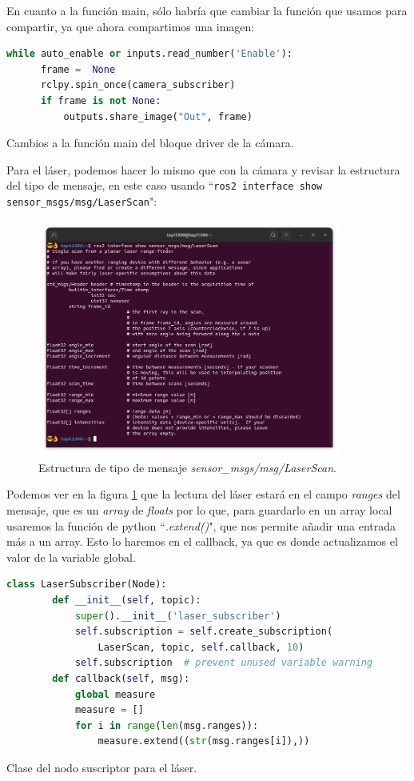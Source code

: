 En cuanto a la función main, sólo habría que cambiar la función que usamos para compartir, ya que ahora compartimos una imagen:
\begin{code}[H]
  \begin{lstlisting}[language=python]
  while auto_enable or inputs.read_number('Enable'):
      frame =  None
      rclpy.spin_once(camera_subscriber)
      if frame is not None:
          outputs.share_image("Out", frame)
  \end{lstlisting}
  \caption[Cambios main bloque cámara]{Cambios a la función main del bloque driver de la cámara.}
  \label{cod:cam_main_changes}
\end{code}
Para el láser, podemos hacer lo mismo que con la cámara y revisar la estructura del tipo de mensaje, en este caso usando ``\lstinline|ros2 interface show sensor_msgs/msg/LaserScan|":
\begin{figure} [H]
  \begin{center}
      \includegraphics[width=10cm]{figs/c4/laserscan_struct.png}
  \end{center}
  \caption[Estructura mensaje LaserScan]{Estructura de tipo de mensaje \textit{sensor\_msgs/msg/LaserScan}.}
  \label{fig:laserscan_struct}
\end{figure}
Podemos ver en la figura \ref{fig:laserscan_struct} que la lectura del láser estará en el campo \textit{ranges} del mensaje, que es un \textit{array} de \textit{floats} por lo que, para guardarlo en un array local usaremos la función de python ``\textit{.extend()}", que nos permite añadir una entrada más a un array. Esto lo haremos en el callback, ya que es donde actualizamos el valor de la variable global.
\begin{code}[H]
  \begin{lstlisting}[language=python]
    class LaserSubscriber(Node):
        def __init__(self, topic):
            super().__init__('laser_subscriber')
            self.subscription = self.create_subscription(
                LaserScan, topic, self.callback, 10)
            self.subscription  # prevent unused variable warning
        def callback(self, msg):
            global measure
            measure = []
            for i in range(len(msg.ranges)):
                measure.extend((str(msg.ranges[i]),))
  \end{lstlisting}
  \caption[Clase del nodo suscriptor para láser]{Clase del nodo suscriptor para el láser.}
  \label{cod:laser_node_class}
\end{code}

